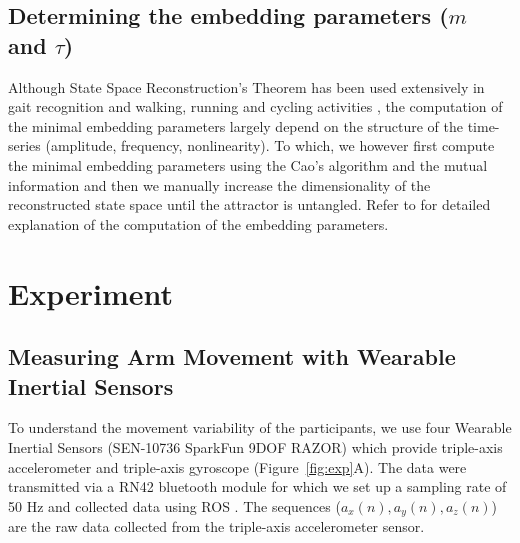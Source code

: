 \documentclass{sigchi}
\begin{document}



\subsection{Determining the embedding parameters ($m$ and $\tau$)}
Although State Space Reconstruction's Theorem has been used extensively in gait
recognition and walking, running and cycling activities \cite{Frank2010, QuintanaDuque2012, Sama2013},
the computation of the minimal embedding parameters largely depend on the
structure of the time-series (amplitude, frequency, nonlinearity).
To which, we however first compute the minimal embedding parameters
using the Cao's algorithm \cite{Cao1997} and the mutual information
and then we manually increase the dimensionality of the reconstructed state
space until the attractor is untangled. Refer to \cite{Cao1997}
for detailed explanation of the computation of the embedding parameters.

\section{Experiment}

\subsection{Measuring Arm Movement with Wearable Inertial Sensors}
To understand the movement variability of the participants, we use
four Wearable Inertial Sensors (SEN-10736 SparkFun 9DOF RAZOR)
which provide triple-axis accelerometer and triple-axis gyroscope (Figure~\ref{fig:exp}A).
The data were transmitted via a RN42 bluetooth module for which we set up a
sampling rate of 50 Hz and collected data using ROS \cite{quigley2009}.
The sequences ($a_x(n),a_y(n),a_z(n)$) are the raw data collected from the
triple-axis accelerometer sensor.
\end{document}
